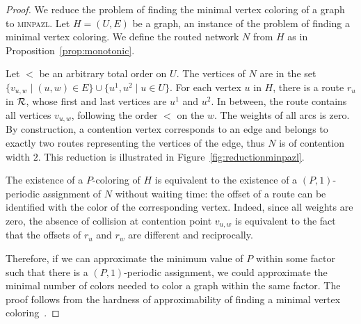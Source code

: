 \documentclass[a4paper,10pt]{journal}
\newcommand\minpazl{\textsc{minpazl}\xspace}
\begin{document}
\begin{proof}
 We reduce the problem of finding the minimal vertex coloring of a graph to \minpazl. Let $H = (U,E)$ be a graph, an instance of the problem of finding a minimal vertex coloring.  We define the routed network $N$ from $H$ as in Proposition~\ref{prop:monotonic}.
 
 Let $<$ be an arbitrary total order on $U$. 
 The vertices of $N$ are in the set $\{v_{u,w} \mid (u,w) \in E\} \cup \{u^1, u^2 \mid u \in U\}$. 
 For each vertex $u$ in $H$, there is a route $r_u$ in ${\cal R}$, whose first and last vertices
 are $u^1$ and $u^2$. In between, the route contains all vertices $v_{u,w}$, following the order $<$ on the $w$. The weights of all arcs is zero. By construction, a contention vertex corresponds to an edge and belongs to exactly two routes representing the vertices of the edge, thus $N$ is of contention width $2$. This reduction is illustrated in Figure~\ref{fig:reductionminpazl}.

  The existence of a $P$-coloring of $H$ is equivalent to the existence of a $(P,1)$-periodic assignment of $N$ without waiting time: the offset of a route can be identified with the color of the corresponding vertex. Indeed, since all weights are zero, the absence of collision at contention point $v_{u,w}$ is equivalent to the fact that the offsets of $r_u$ and $r_w$ are different and reciprocally.

   Therefore, if we can approximate the minimum value of $P$ within some factor such that there is a $(P,1)$-periodic assignment, we could approximate the minimal number of colors needed to color a graph within the same factor. The proof follows from the hardness of approximability of finding a minimal vertex coloring~\cite{zuckerman2006linear}.
\end{proof}
\end{document}
